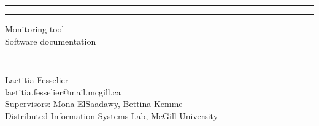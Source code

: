 \documentclass[12pt,hidelinks]{article}
\begin{document}
\begin{titlepage}
	\centering %
	\scshape %
	\vspace*{1.5\baselineskip} %

	\rule{13cm}{1.6pt}\vspace*{-\baselineskip}\vspace*{2pt} %
	\rule{13cm}{0.4pt} %
	
		\vspace{0.75\baselineskip} %
    {	\Huge Monitoring tool\\
            \vspace{2mm}
        Software documentation \\  }
		\vspace{0.75\baselineskip} %
	\rule{13cm}{0.4pt}\vspace*{-\baselineskip}\vspace{3.2pt} %
	\rule{13cm}{1.6pt} %
	
		\vspace{1.75\baselineskip} %
	{\large Laetitia Fesselier \\
	laetitia.fesselier@mail.mcgill.ca} \\
	Supervisors: Mona ElSaadawy, Bettina Kemme \\
	\vfill
Distributed Information Systems Lab, McGill University \\
\end{titlepage}
\tableofcontents
\vfill
\newpage
{}
\end{document}
